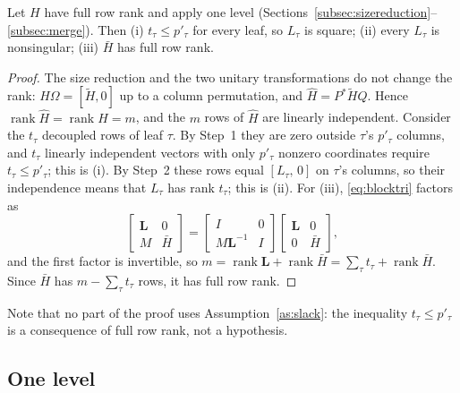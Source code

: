 \begin{lemma}\label{lem:rank}
Let $H$ have full row rank and apply one level (Sections~\ref{subsec:sizereduction}--\ref{subsec:merge}).
Then (i) $t_\tau\le p'_\tau$ for every leaf, so $L_\tau$ is square; (ii) every $L_\tau$ is nonsingular;
(iii) $\bar H$ has full row rank.
\end{lemma}
\begin{proof}
The size reduction and the two unitary transformations do not change the rank:
$H\Omega=[\tilde H,0]$ up to a column permutation, and $\hat H=P^*\tilde HQ$. Hence
$\operatorname{rank}\hat H=\operatorname{rank}H=m$, and the $m$ rows of $\hat H$ are linearly independent.
Consider the $t_\tau$ decoupled rows of leaf $\tau$. By Step~1 they are zero outside $\tau$'s $p'_\tau$
columns, and $t_\tau$ linearly independent vectors with only $p'_\tau$ nonzero coordinates require
$t_\tau\le p'_\tau$; this is (i). By Step~2 these rows equal $[L_\tau,\,0]$ on $\tau$'s columns, so their
independence means that $L_\tau$ has rank $t_\tau$; this is (ii). For (iii), \eqref{eq:blocktri} factors as
\[
\begin{bmatrix}\mathbf L&0\\M&\bar H\end{bmatrix}=\begin{bmatrix}I&0\\M\mathbf L^{-1}&I\end{bmatrix}
\begin{bmatrix}\mathbf L&0\\0&\bar H\end{bmatrix},
\]
and the first factor is invertible, so $m=\operatorname{rank}\mathbf L+\operatorname{rank}\bar H=\sum_\tau t_\tau+\operatorname{rank}\bar H$.
Since $\bar H$ has $m-\sum_\tau t_\tau$ rows, it has full row rank.
\end{proof}
Note that no part of the proof uses Assumption~\ref{as:slack}: the inequality $t_\tau\le p'_\tau$ is a
consequence of full row rank, not a hypothesis.

\subsection{One level}

